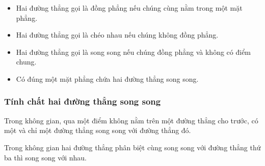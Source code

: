 \begin{dn}
	\begin{itemize}
		\item Hai đường thẳng gọi là đồng phẳng nếu chúng cùng nằm trong một mặt phẳng.
		\item Hai đường thẳng gọi là chéo nhau nếu chúng không đồng phẳng.
		\item Hai đường thẳng gọi là song song nếu chúng đồng phẳng và không có điểm chung.
		\item Có đúng một mặt phẳng chứa hai đường thẳng song song.
	\end{itemize}
\end{dn}
\subsubsection{Tính chất hai đường thẳng song song}
\begin{tc}
	Trong không gian, qua một điểm không nằm trên một đường thẳng cho trước, có một và chỉ một đường thẳng song song với đường thẳng đó.
\end{tc}
\begin{tc}
	Trong không gian hai đường thẳng phân biệt cùng song song với đường thẳng thứ ba thì song song với nhau.
\end{tc}
